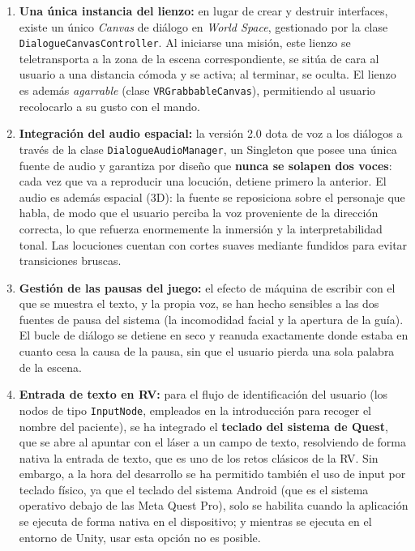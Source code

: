 \documentclass[12pt,twoside,titlepage]{report}
\begin{document}
\begin{enumerate}[label=\textbf{\arabic*.}, leftmargin=1.5cm, itemsep=0.5em]
  \item \textbf{Una única instancia del lienzo:} en lugar de crear y destruir interfaces, existe un único \textit{Canvas} de diálogo en \textit{World Space}, gestionado por la clase \texttt{DialogueCanvasController}.
Al iniciarse una misión, este lienzo se teletransporta a la zona de la escena correspondiente, se sitúa de cara al usuario a una distancia cómoda y se activa; al terminar, se oculta.
El lienzo es además \textit{agarrable} (clase \texttt{VRGrabbableCanvas}), permitiendo al usuario recolocarlo a su gusto con el mando.
  \item \textbf{Integración del audio espacial:} la versión 2.0 dota de voz a los diálogos a través de la clase \texttt{DialogueAudioManager}, un Singleton que posee una única fuente de audio y garantiza por diseño que \textbf{nunca se solapen dos voces}: cada vez que va a reproducir una locución, detiene primero la anterior.
El audio es además espacial (3D): la fuente se reposiciona sobre el personaje que habla, de modo que el usuario perciba la voz proveniente de la dirección correcta, lo que refuerza enormemente la inmersión y la interpretabilidad tonal.
Las locuciones cuentan con cortes suaves mediante fundidos para evitar transiciones bruscas.
  \item \textbf{Gestión de las pausas del juego:} el efecto de máquina de escribir con el que se muestra el texto, y la propia voz, se han hecho sensibles a las dos fuentes de pausa del sistema (la incomodidad facial y la apertura de la guía).
El bucle de diálogo se detiene en seco y reanuda exactamente donde estaba en cuanto cesa la causa de la pausa, sin que el usuario pierda una sola palabra de la escena.
  \item \textbf{Entrada de texto en RV:} para el flujo de identificación del usuario (los nodos de tipo \texttt{InputNode}, empleados en la introducción para recoger el nombre del paciente), se ha integrado el \textbf{teclado del sistema de Quest}, que se abre al apuntar con el láser a un campo de texto, resolviendo de forma nativa la entrada de texto, que es uno de los retos clásicos de la RV. Sin embargo, a la hora del desarrollo se ha permitido también el uso de input por teclado físico, ya que el teclado del sistema Android (que es el sistema operativo debajo de las Meta Quest Pro), solo se habilita cuando la aplicación se ejecuta de forma nativa en el dispositivo; y mientras se ejecuta en el entorno de Unity, usar esta opción no es posible.
\end{enumerate}
\end{document}
